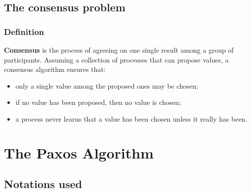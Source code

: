 \documentclass{beamer}
\begin{document}
\subsection{The consensus problem}


\begin{frame}
  \frametitle{Definition}
  
  \textbf{Consensus} is the process of agreeing on one single result among a group of participants. Assuming a collection of processes that can propose values, a consensus algorithm ensures that:
  
  \begin{itemize}
    \item only a single value among the proposed ones may be chosen;
    \item if no value has been proposed, then no value is chosen;
    \item a process never learns that a value has been chosen unless it really has been.
  \end{itemize}



\end{frame}



\section{The Paxos Algorithm}

\subsection{Notations used}
\end{document}
